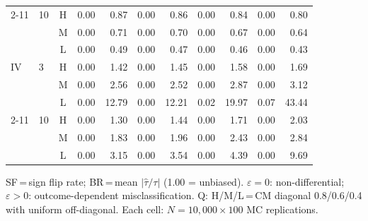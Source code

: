 \begin{table}[H]
{\begin{tabular}{llcrrrrrrrr}
\cmidrule{2-11}
 & 10 & H & 0.00 & 0.87 & 0.00 & 0.86 & 0.00 & 0.84 & 0.00 & 0.80 \\
 &  & M & 0.00 & 0.71 & 0.00 & 0.70 & 0.00 & 0.67 & 0.00 & 0.64 \\
 &  & L & 0.00 & 0.49 & 0.00 & 0.47 & 0.00 & 0.46 & 0.00 & 0.43 \\
\midrule
IV & 3 & H & 0.00 & 1.42 & 0.00 & 1.45 & 0.00 & 1.58 & 0.00 & 1.69 \\
 &  & M & 0.00 & 2.56 & 0.00 & 2.52 & 0.00 & 2.87 & 0.00 & 3.12 \\
 &  & L & 0.00 & 12.79 & 0.00 & 12.21 & 0.02 & 19.97 & 0.07 & 43.44 \\
\cmidrule{2-11}
 & 10 & H & 0.00 & 1.30 & 0.00 & 1.44 & 0.00 & 1.71 & 0.00 & 2.03 \\
 &  & M & 0.00 & 1.83 & 0.00 & 1.96 & 0.00 & 2.43 & 0.00 & 2.84 \\
 &  & L & 0.00 & 3.15 & 0.00 & 3.54 & 0.00 & 4.39 & 0.00 & 9.69 \\
\bottomrule
\end{tabular}}
\vspace{1mm}
\parbox{\columnwidth}{\footnotesize SF\,=\,sign flip rate; BR\,=\,mean $|\hat\tau/\tau|$ (1.00 = unbiased). $\varepsilon\!=\!0$: non-differential; $\varepsilon\!>\!0$: outcome-dependent misclassification. Q: H/M/L\,=\,CM diagonal 0.8/0.6/0.4 with uniform off-diagonal. Each cell: $N\!=\!10{,}000\!\times\!100$ MC replications.}
\end{table}
